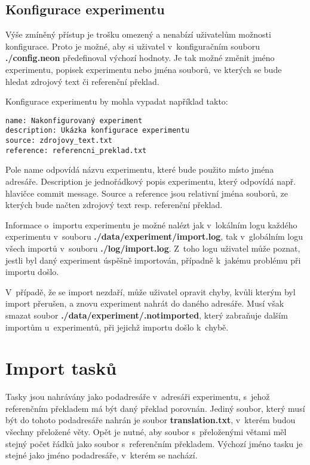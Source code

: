 \subsection{Konfigurace experimentu}
Výše zmíněný přístup je trošku omezený a nenabízí uživatelům možnosti konfigurace.
Proto je možné,
  aby si uživatel v~konfiguračním souboru \textbf{./config.neon} předefinoval výchozí hodnoty.
Je tak možné změnit jméno experimentu, popisek experimentu nebo jména souborů,
  ve kterých se bude hledat zdrojový text či referenční překlad.

Konfigurace experimentu by mohla vypadat například takto: \\

\begin{verbatim}
name: Nakonfigurovaný experiment
description: Ukázka konfigurace experimentu
source: zdrojovy_text.txt
reference: referencni_preklad.txt
\end{verbatim}

Pole name odpovídá názvu experimentu, které bude použito místo jména adresáře.
Description je jednořádkový popis experimentu,
  který odpovídá např. hlavičce commit message.
Source a reference jsou relativní jména souborů,
  ze kterých bude načten zdrojový text resp. referenční překlad.

Informace o~importu experimentu je možné nalézt
  jak v~lokálním logu každého experimentu v~souboru \textbf{./data/experiment/import.log},
  tak v~globálním logu všech importů v~souboru \textbf{./log/import.log}.
Z~toho logu uživatel může poznat,
  jestli byl daný experiment úspěšně importován,
  případně k~jakému problému při importu došlo.

V~případě, že se import nezdaří,
  může uživatel opravit chyby,
  kvůli kterým byl import přerušen,
  a znovu experiment nahrát do daného adresáře.
Musí však smazat soubor \textbf{./data/experiment/.notimported},
  který zabraňuje dalším importům u~experimentů,
  při jejichž importu došlo k~chybě.


\section{Import tasků}
Tasky jsou nahrávány jako podadresáře v~adresáři experimentu,
  s~jehož referenčním překladem má být daný překlad porovnán.
Jediný soubor, který musí být do tohoto podadresáře nahrán je soubor \textbf{translation.txt},
  v~kterém budou všechny přeložené věty.
Opět je nutné, aby soubor s~přeloženými větami měl stejný počet řádků jako soubor s~referenčním překladem.
Výchozí jméno tasku je stejné jako jméno podadresáře, v~kterém se nachází.

